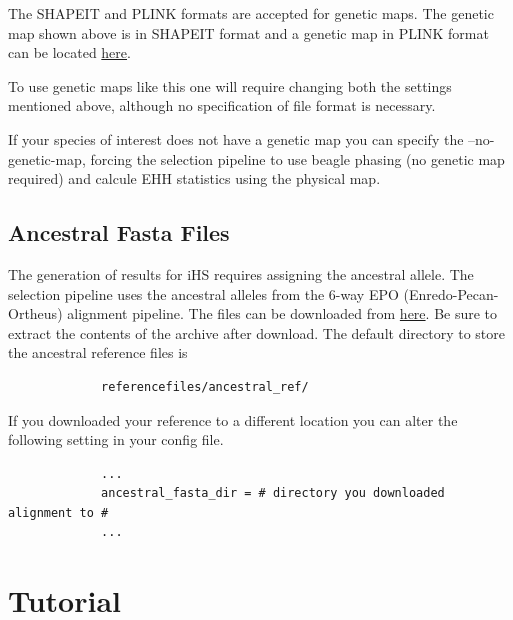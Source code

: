 \documentclass[a4paper,10pt]{article}
\begin{document}
             \noindent
             The SHAPEIT and PLINK formats are accepted for genetic maps.
             The genetic map shown above is in SHAPEIT format and a genetic map in PLINK format can be located
             \href{http://bochet.gcc.biostat.washington.edu/beagle/genetic_maps/plink.GRCh37.map.zip}{here}.

             To use genetic maps like this one will require changing both the settings mentioned above, although
             no specification of file format is necessary.

             If your species of interest does not have a genetic map you can specify the --no-genetic-map, forcing
             the selection pipeline to use beagle phasing (no genetic map required) and calcule EHH statistics using
             the physical map.  

             \subsection{Ancestral Fasta Files}
             The generation of results for iHS requires assigning the ancestral
             allele. The selection pipeline uses the ancestral alleles from the
             6-way EPO (Enredo-Pecan-Ortheus) alignment pipeline. The files can be
             downloaded from
             \href{ftp://ftp.1000genomes.ebi.ac.uk/vol1/ftp/phase1/analysis_results/supporting/ancestral_alignments/human_ancestor_GRCh37_e59.tar.bz2}{here}. Be
             sure to extract the contents of the archive after download. The default
             directory to store the ancestral reference files is\\
             \begin{verbatim}
             referencefiles/ancestral_ref/
             \end{verbatim}

             \noindent
             If you downloaded your reference to a different location you can alter the following setting in your config file.\\
             \begin{verbatim}
             ...
             ancestral_fasta_dir = # directory you downloaded alignment to #
             ...
             \end{verbatim}

             \section{Tutorial}
\end{document}
